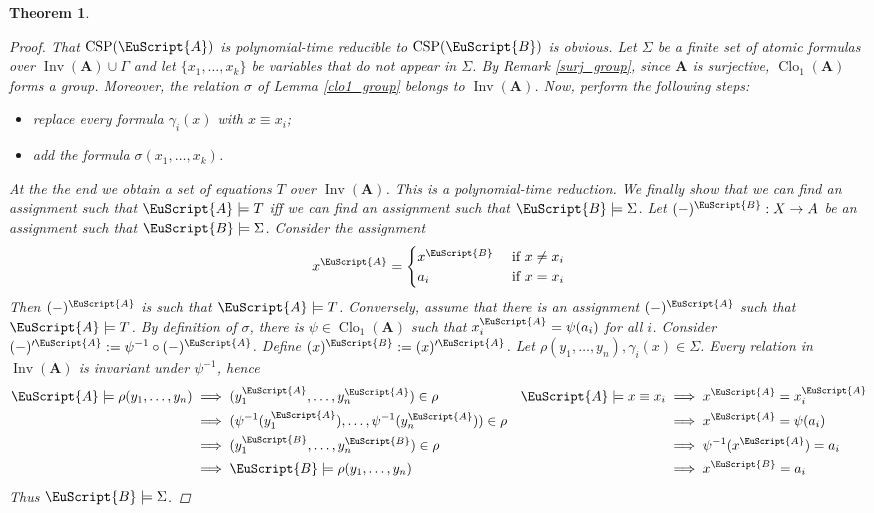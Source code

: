 \documentclass{amsart}
\theoremstyle{plain}
\newtheorem{theorem}{Theorem}[section]
\theoremstyle{definition}
\theoremstyle{remark}
\DeclareMathOperator{\Clo}{Clo}
\DeclareMathOperator{\CSP}{CSP}
\DeclareMathOperator{\Inv}{Inv}
\begin{document}
\begin{theorem}
\begin{proof}
    That $\CSP(\EuScript{A})$ is polynomial-time reducible to $\CSP(\EuScript{B})$ is obvious.
    Let $\Sigma$ be a finite set of atomic formulas over $\Inv(\mathbf{A}) \cup \Gamma$ and let $\{x_1, \ldots, x_k\}$ be variables that do not appear in $\Sigma$. 
    By Remark \ref{surj_group}, since $\mathbf{A}$ is surjective, $\Clo_1(\mathbf{A})$ forms a group. 
    Moreover, the relation $\sigma$ of Lemma \ref{clo1_group} belongs to $\Inv(\mathbf{A})$. 
    Now, perform the following steps: 
        \begin{itemize}
            \item replace every formula $\gamma_i(x)$ with $x \equiv x_i$; 
            \item add the formula $\sigma(x_1, \ldots, x_k)$. 
        \end{itemize}
    At the the end we obtain a set of equations $T$ over $\Inv(\mathbf{A})$. 
    {This is a polynomial-time reduction.}
    We finally show that we can find an assignment such that $\EuScript{A} \models T$ iff we can find an assignment such that $\EuScript{B} \models \Sigma$.
    Let $(-)^{\EuScript{B}}: X \to A$ be an assignment such that $\EuScript{B} \models \Sigma$. 
    Consider the assignment 
    \begin{equation*}
        x^{\EuScript{A}} = 
        \begin{cases}
            x^{\EuScript{B}} & \text{ if } x \neq x_i \\
            a_i & \text{ if } x = x_i 
        \end{cases}
    \end{equation*}
    Then $(-)^\EuScript{A}$ is such that $\EuScript{A} \models T$.  
    Conversely, assume that there is an assignment $(-)^{\EuScript{A}}$ such that $\EuScript{A} \models T$. 
    By definition of $\sigma$, there is $\psi \in \Clo_1(\mathbf{A})$ such that $x_i^{\EuScript{A}} = \psi(a_i)$ for all $i$. 
    Consider $(-)'^{\EuScript{A}}:=\psi^{-1}\circ(-)^{\EuScript{A}}$. 
    Define $(x)^{\EuScript{B}}:=(x)'^{\EuScript{A}}$.
    Let $\rho(y_1, \ldots, y_n), \gamma_i(x) \in \Sigma$. 
    Every relation in $\Inv(\mathbf{A})$ is invariant under $\psi^{-1}$, hence  
    \begin{alignat*}{2}
        \EuScript{A} \models \rho(y_1, \ldots, y_n) & \implies (y_1^{\EuScript{A}}, \ldots, y_n^{\EuScript{A}}) \in \rho  & \EuScript{A} \models x \equiv x_i &  \implies x^{\EuScript{A}} = x_i^{\EuScript{A}}  \\
        & \implies (\psi^{-1}(y_1^{\EuScript{A}}), \ldots, \psi^{-1}(y_n^{\EuScript{A}})) \in \rho  &   & \implies x^{\EuScript{A}}=\psi(a_i) \\
        & \implies (y_1^{\EuScript{B}}, \ldots, y_n^{\EuScript{B}}) \in \rho  &   & \implies \psi^{-1}(x^{\EuScript{A}}) = a_i   \\
        & \implies \EuScript{B} \models \rho(y_1, \ldots, y_n)  &    & \implies x^{\EuScript{B}}= a_i  
    \end{alignat*}
    Thus $\EuScript{B} \models \Sigma$. 
\end{proof}
\end{theorem}
\end{document}
